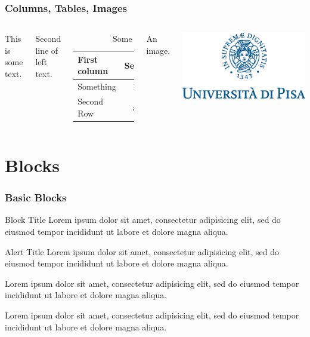 \documentclass[aspectratio=169]{beamer}
\begin{document}
\begin{frame}
	\frametitle{Columns, Tables, Images}
	\begin{columns}
		This is some text.

		Second line of left text.

		\begin{table}
			\begin{tabular}{l | c | c}
				First column & Second & Third \\
				\hline \hline
				Something & 110 & 123 \\
				Second Row & abc & def
			\end{tabular}
			\caption{Some data}
		\end{table}
		An image.

		\includegraphics[scale=0.2]{img/marchio_unipi_pant541}
	\end{columns}
\end{frame}

\section{Blocks}

\begin{frame}
	\frametitle{Basic Blocks}
	\begin{block}{Block Title}
		Lorem ipsum dolor sit amet, consectetur adipisicing elit, sed do
		eiusmod tempor incididunt ut labore et	dolore magna aliqua.
	\end{block}
	\begin{alertblock}{Alert Title}
		Lorem ipsum dolor sit amet, consectetur adipisicing elit, sed do
		eiusmod tempor incididunt ut labore et	dolore magna aliqua.
	\end{alertblock}
	\begin{definition}
		Lorem ipsum dolor sit amet, consectetur adipisicing elit, sed do
		eiusmod tempor incididunt ut labore et	dolore magna aliqua.
	\end{definition}
	\begin{example}
		Lorem ipsum dolor sit amet, consectetur adipisicing elit, sed do
		eiusmod tempor incididunt ut labore et	dolore magna aliqua.
	\end{example}
\end{frame}
\end{document}
